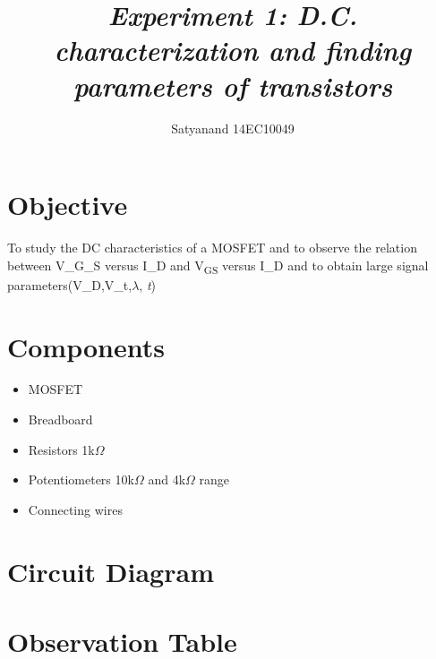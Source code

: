 \documentclass[12pt]{extarticle}
\title{{\it \textbf{Experiment 1:\hspace{0.5cm} D.C. characterization and finding parameters of transistors}\/} }
\author
{Satyanand 14EC10049\\
\normalize{Rohit Kumar 14EC10043}
}
\date{}
\renewcommand{\baselinestretch}{0.5}
\begin{document}
 


\baselineskip14pt










\renewcommand{\baselinestretch}{0.5} 

\section*{Objective}


To study the DC characteristics of a MOSFET and to
observe the relation between V\_G\_S versus I\_D and 
V\textsubscript{GS} versus I\_D and to obtain large signal parameters(V\_D,V\_t,$\lambda$,
\textit{t})

\section*{Components}
\begin{itemize}
    \item MOSFET
    \item Breadboard%
    \item Resistors 1k$\Omega$
    \item Potentiometers 10k$\Omega$ and  4k$\Omega$  range
    \item Connecting wires
\end{itemize}

\section*{Circuit Diagram}
  

\section*{Observation Table}
\end{document}
